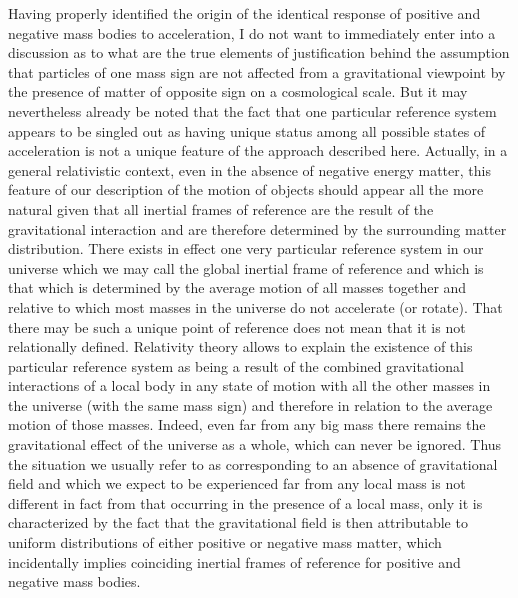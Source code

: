 \documentclass[notitlepage,12pt]{report}
\begin{document}
\noindent Having properly identified the origin of the identical response of positive and negative mass bodies to acceleration, I do not want to immediately enter into a discussion as to what are the true elements of justification behind the assumption that particles of one mass sign are not affected from a gravitational viewpoint by the presence of matter of opposite sign on a cosmological scale. But it may nevertheless already be noted that the fact that one particular reference system appears to be singled out as having unique status among all possible states of acceleration is not a unique feature of the approach described here. Actually, in a general relativistic context, even in the absence of negative energy matter, this feature of our description of the motion of objects should appear all the more natural given that all inertial frames of reference are the result of the gravitational interaction and are therefore determined by the surrounding matter distribution. There exists in effect one very particular reference system in our universe which we may call the global inertial frame of reference and which is that which is determined by the average motion of all masses together and relative to which most masses in the universe do not accelerate (or rotate). That there may be such a unique point of reference does not mean that it is not relationally defined. Relativity theory allows to explain the existence of this particular reference system as being a result of the combined gravitational interactions of a local body in any state of motion with all the other masses in the universe (with the same mass sign) and therefore in relation to the average motion of those masses. Indeed, even far from any big mass there remains the gravitational effect of the universe as a whole, which can never be ignored. Thus the situation we usually refer to as corresponding to an absence of gravitational field and which we expect to be experienced far from any local mass is not different in fact from that occurring in the presence of a local mass, only it is characterized by the fact that the gravitational field is then attributable to uniform distributions of either positive or negative mass matter, which incidentally implies coinciding inertial frames of reference for positive and negative mass bodies.
\end{document}
